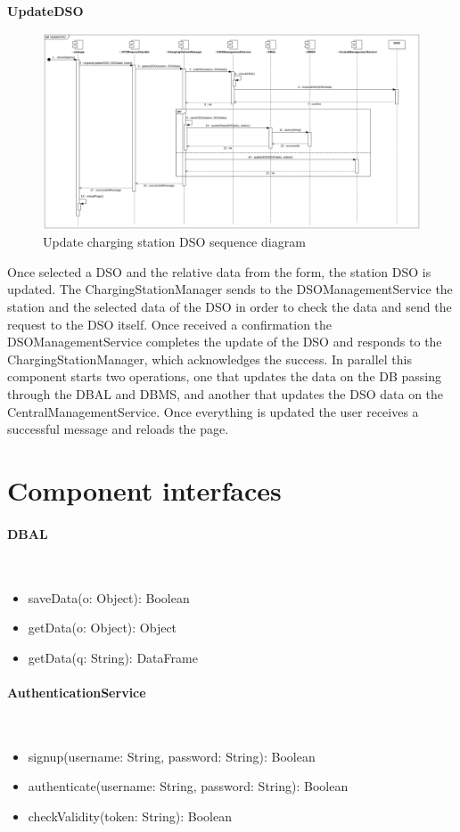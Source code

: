 \clearpage
\textbf{UpdateDSO}\\
\begin{figure}[H]
    \centering
    \includegraphics[width=1\textwidth]{Images/cp2/runtime/UpdateDSO.png}
    \caption{Update charging station DSO sequence diagram}
\end{figure}
Once selected a DSO and the relative data from the form, the station DSO is updated. The ChargingStationManager sends to the DSOManagementService the station and the selected data of the DSO in order to check the data and send the request to the DSO itself. Once received a confirmation the DSOManagementService completes the update of the DSO and responds to the ChargingStationManager, which acknowledges the success. In parallel this component starts two operations, one that updates the data on the DB passing through the DBAL and DBMS, and another that updates the DSO data on the CentralManagementService. Once everything is updated the user receives a successful message and reloads the page. 

\clearpage
\section{Component interfaces}
\paragraph{DBAL}\mbox{}\\
\begin{itemize}
    \item saveData(o: Object): Boolean
    \item getData(o: Object): Object
    \item getData(q: String): DataFrame
\end{itemize}

\paragraph{AuthenticationService}\mbox{}\\
\begin{itemize}
    \item signup(username: String, password: String): Boolean
    \item authenticate(username: String, password: String): Boolean
    \item checkValidity(token: String): Boolean
\end{itemize}

